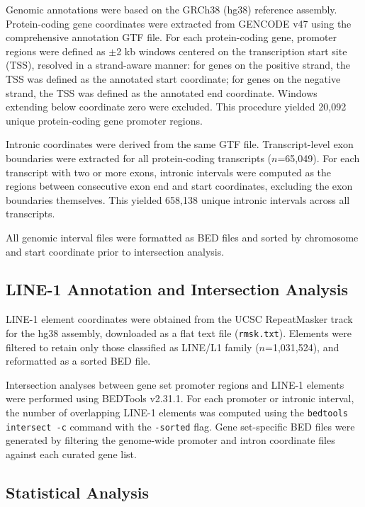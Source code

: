 \documentclass[11pt, a4paper]{article}
\begin{document}
Genomic annotations were based on the GRCh38 (hg38) reference
assembly. Protein-coding gene coordinates were extracted from
GENCODE v47\cite{frankish2023} using the comprehensive
annotation GTF file. For each protein-coding gene, promoter
regions were defined as $\pm$2 kb windows centered on the
transcription start site (TSS), resolved in a strand-aware
manner: for genes on the positive strand, the TSS was defined
as the annotated start coordinate; for genes on the negative
strand, the TSS was defined as the annotated end coordinate.
Windows extending below coordinate zero were excluded. This
procedure yielded 20,092 unique protein-coding gene promoter
regions.

Intronic coordinates were derived from the same GTF file.
Transcript-level exon boundaries were extracted for all
protein-coding transcripts ($n$=65,049). For each transcript
with two or more exons, intronic intervals were computed as
the regions between consecutive exon end and start coordinates,
excluding the exon boundaries themselves. This yielded 658,138
unique intronic intervals across all transcripts.

All genomic interval files were formatted as BED files and
sorted by chromosome and start coordinate prior to intersection
analysis.

\subsection*{LINE-1 Annotation and Intersection Analysis}

LINE-1 element coordinates were obtained from the UCSC
RepeatMasker track for the hg38 assembly\cite{smit2015},
downloaded as a flat text file
(\texttt{rmsk.txt}). Elements were filtered to retain only
those classified as LINE/L1 family ($n$=1,031,524), and
reformatted as a sorted BED file.

Intersection analyses between gene set promoter regions and
LINE-1 elements were performed using BEDTools v2.31.1\cite{quinlan2010}.
For each promoter or intronic interval, the number of
overlapping LINE-1 elements was computed using the
\texttt{bedtools intersect -c} command with the \texttt{-sorted}
flag. Gene set-specific BED files were generated by filtering
the genome-wide promoter and intron coordinate files against
each curated gene list.

\subsection*{Statistical Analysis}
\end{document}
